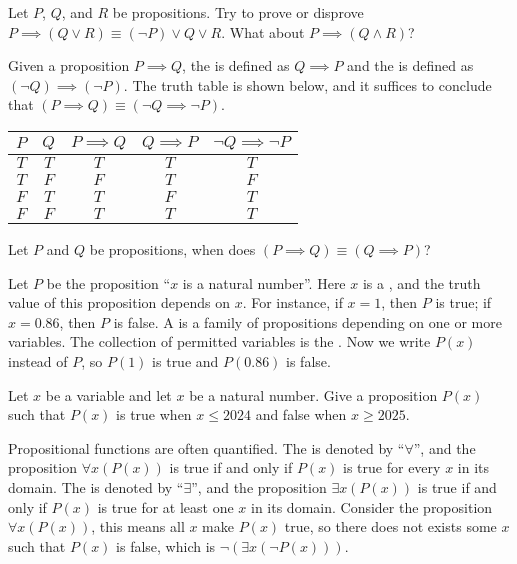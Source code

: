 \documentclass[10pt]{article}
\begin{document}
\begin{problem}
    Let $P$, $Q$, and $R$ be propositions. Try to prove or disprove $P\implies(Q\vee R)\equiv(\neg P)\vee Q\vee R$. What about $P\implies(Q\wedge R)$?
\end{problem}
\par
Given a proposition $P\implies Q$, the  is defined as $Q\implies P$ and the  is defined as $(\neg Q)\implies(\neg P)$. The truth table is shown below, and it suffices to conclude that $(P\implies Q)\equiv(\neg Q\implies\neg P)$.
\begin{center}
    \begin{tabular}{cc|ccc}
        $P$ & $Q$ & $P\implies Q$ & $Q\implies P$ & $\neg Q\implies\neg P$ \\
        \hline
        $T$ & $T$ & $T$ & $T$ & $T$ \\
        $T$ & $F$ & $F$ & $T$ & $F$ \\
        $F$ & $T$ & $T$ & $F$ & $T$ \\
        $F$ & $F$ & $T$ & $T$ & $T$
    \end{tabular}
\end{center}
\begin{problem}
    Let $P$ and $Q$ be propositions, when does $(P\implies Q)\equiv(Q\implies P)$?
\end{problem}
\par
Let $P$ be the proposition ``$x$ is a natural number''. Here $x$ is a , and the truth value of this proposition depends on $x$. For instance, if $x=1$, then $P$ is true; if $x=0.86$, then $P$ is false. A  is a family of propositions depending on one or more variables. The collection of permitted variables is the . Now we write $P(x)$ instead of $P$, so $P(1)$ is true and $P(0.86)$ is false.
\begin{problem}
    Let $x$ be a variable and let $x$ be a natural number. Give a proposition $P(x)$ such that $P(x)$ is true when $x\le 2024$ and false when $x\ge 2025$.
\end{problem}
\par
Propositional functions are often quantified. The  is denoted by ``$\forall$'', and the proposition $\forall x(P(x))$ is true if and only if $P(x)$ is true for every $x$ in its domain. The  is denoted by ``$\exists$'', and the proposition $\exists x(P(x))$ is true if and only if $P(x)$ is true for at least one $x$ in its domain. Consider the proposition $\forall x(P(x))$, this means all $x$ make $P(x)$ true, so there does not exists some $x$ such that $P(x)$ is false, which is $\neg(\exists x(\neg P(x)))$.
\end{document}
